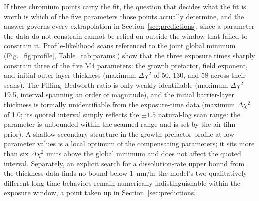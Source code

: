 \documentclass[pdflatex,sn-nature]{sn-jnl}
\begin{document}
If three chromium points carry the fit, the question that decides what
the fit is worth is which of the five parameters those points actually
determine, and the answer governs every extrapolation in
Section~\ref{sec:predictions}, since a parameter the data do not
constrain cannot be relied on outside the window that failed to
constrain it. Profile-likelihood scans referenced to the joint global
minimum (Fig.~\ref{fig:profile}, Table~\ref{tab:params}) show that the
three exposure times sharply constrain three of the five M4 parameters:
the growth prefactor, field exponent, and initial outer-layer thickness
(maximum $\Delta\chi^2$ of 50, 130, and 58 across their scans). The
Pilling--Bedworth ratio is only weakly identifiable (maximum
$\Delta\chi^2$ 19.5, interval spanning an order of magnitude), and the
initial barrier-layer thickness is formally unidentifiable from the
exposure-time data (maximum $\Delta\chi^2$ of 1.0; its quoted interval
simply reflects the $\pm1.5$ natural-log scan range: the parameter is
unbounded within the scanned range and is set by the air-film prior). A
shallow secondary structure in the growth-prefactor profile at low
parameter values is a local optimum of the compensating parameters; it
sits more than six $\Delta\chi^2$ units above the global minimum and
does not affect the quoted interval. Separately, an explicit search for
a dissolution-rate upper bound from the thickness data finds no bound
below 1~nm/h: the model's two qualitatively different long-time
behaviors remain numerically indistinguishable within the exposure
window, a point taken up in Section~\ref{sec:predictions}.
\end{document}
